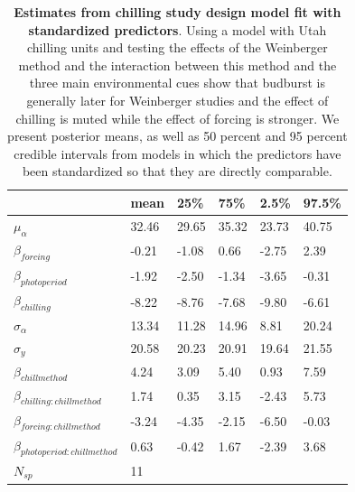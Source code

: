 \documentclass{article}
\begin{document}
\begin{footnotesize}
\begin{table}[ht]
\centering
\caption{\textbf{Estimates from chilling study design model fit with standardized predictors}. Using a model with Utah chilling units and testing the effects of the Weinberger method and the interaction between this method and the three main environmental cues  show that budburst is generally later for Weinberger studies and the effect of chilling is muted while the effect of forcing is stronger. We present posterior means, as well as 50 percent and 95 percent credible intervals from models in which the predictors have been standardized so that they are directly comparable.} 
\label{tab:methods}
\begingroup\footnotesize
\begin{tabular}{|p{}|p{}|p{}|p{}|p{}|p{}|}
  \hline
 & mean & 25\% & 75\% & 2.5\% & 97.5\% \\ 
  \hline
$\mu_{\alpha}$ & 32.46 & 29.65 & 35.32 & 23.73 & 40.75 \\ 
  $\beta_{forcing}$ & -0.21 & -1.08 & 0.66 & -2.75 & 2.39 \\ 
  $\beta_{photoperiod}$ & -1.92 & -2.50 & -1.34 & -3.65 & -0.31 \\ 
  $\beta_{chilling}$ & -8.22 & -8.76 & -7.68 & -9.80 & -6.61 \\ 
  $\sigma_{\alpha}$ & 13.34 & 11.28 & 14.96 & 8.81 & 20.24 \\ 
  $\sigma_{y}$ & 20.58 & 20.23 & 20.91 & 19.64 & 21.55 \\ 
  $\beta_{chillmethod}$ & 4.24 & 3.09 & 5.40 & 0.93 & 7.59 \\ 
  $\beta_{chilling : chillmethod}$ & 1.74 & 0.35 & 3.15 & -2.43 & 5.73 \\ 
  $\beta_{forcing : chillmethod}$ & -3.24 & -4.35 & -2.15 & -6.50 & -0.03 \\ 
  $\beta_{photoperiod : chillmethod}$ & 0.63 & -0.42 & 1.67 & -2.39 & 3.68 \\ 
   \hline
$N_{sp}$ & 11 &  &  &  &  \\ 
   \hline
\end{tabular}
\endgroup
\end{table}


\end{footnotesize}
\end{document}
